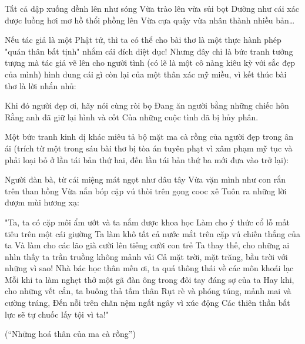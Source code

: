 \documentclass[../main.tex]{subfiles}
\begin{document}
\begin{multicols}{2}
\begin{blockquote}
Tất cả dập xuống dềnh lên như sóng        
Vừa trào lên vừa sủi bọt        
Dường như cái xác được luồng hơi mơ hồ thổi phồng lên        
Vừa cựa quậy vừa nhân thành nhiều bản… 

\end{blockquote}
 
Nếu tác giả là một Phật tử, thì ta có thể cho bài thơ là một thực hành phép "quán thân bất tịnh" nhắm cái đích diệt dục! Nhưng đây chỉ là bức tranh tưởng tượng mà tác giả vẽ lên cho người tình (có lẽ là một cô nàng kiêu kỳ với sắc đẹp của mình) hình dung cái gì còn lại của một thân xác mỹ miều, vì kết thúc bài thơ là lời nhắn nhủ: 
\begin{blockquote}
        
Khi đó người đẹp ơi, hãy nói cùng ròi bọ        
Đang ăn người bằng những chiếc hôn        
Rằng anh đã giữ lại hình và cốt        
Của những cuộc tình đã bị hủy phân. 

\end{blockquote}
 
Một bức tranh kinh dị khác miêu tả bộ mặt ma cà rồng của người đẹp trong ân ái (trích từ một trong sáu bài thơ bị tòa án tuyên phạt vì xâm phạm mỹ tục và phải loại bỏ ở lần tái bản thứ hai, đến lần tái bản thứ ba mới đưa vào trở lại): 
\begin{blockquote}
        
Người đàn bà, từ cái miệng mát ngọt như dâu tây        
Vừa vặn mình như con rắn trên than hồng        
Vừa nắn bóp cặp vú thòi trên gọng cooc xê        
Tuôn ra những lời đượm mùi hương xạ: 
        
"Ta, ta có cặp môi ẩm ướt và ta nắm được khoa học        
Làm cho ý thức cổ lỗ mất tiêu trên một cái giường        
Ta làm khô tất cả nước mắt trên cặp vú chiến thắng của ta        
Và làm cho các lão già cười lên tiếng cười con trẻ        
Ta thay thế, cho những ai nhìn thấy ta trần truồng không mảnh vải        
Cả mặt trời, mặt trăng, bầu trời với những vì sao!        
Nhà bác học thân mến ơi, ta quá thông thái về các môn khoái lạc        
Mỗi khi ta làm nghẹt thở một gã đàn ông trong đôi tay đáng sợ của ta        
Hay khi, cho những vết cắn, ta buông thả tấm thân        
Rụt rè và phóng túng, mảnh mai và cường tráng,        
Đến nỗi trên chăn nệm ngất ngây vì xúc động        
Các thiên thần bất lực sẽ tự chuốc lấy tội vì ta!" 
        
(“Những hoá thân của ma cà rồng”) 

\end{blockquote}
 

\end{multicols}
\end{document}
